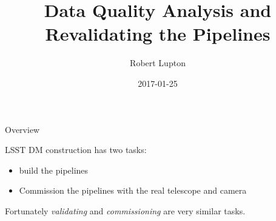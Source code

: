 \documentclass[t]{beamer}
\author{Robert Lupton}
\date{2017-01-25}
\title{Data Quality Analysis and Revalidating the Pipelines}
\begin{document}
\maketitle

\begin{frame}{Overview}

LSST DM construction has two tasks:
\begin{itemize}
\item build the pipelines
\item Commission the pipelines with the real telescope and camera
\end{itemize}

\pause
Fortunately \emph{validating} and \emph{commissioning} are very similar tasks.

\end{frame}
\end{document}
